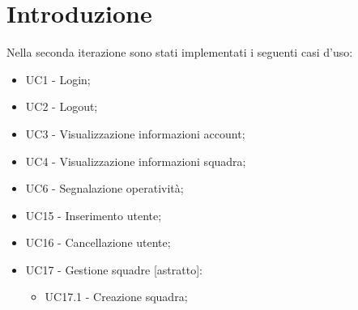 \section{Introduzione}
Nella seconda iterazione sono stati implementati i seguenti casi d'uso:
\begin{itemize}
	\item UC1 - Login;
	\item UC2 - Logout;
	\item UC3 - Visualizzazione informazioni account;
	\item UC4 - Visualizzazione informazioni squadra;
	\item UC6 - Segnalazione operatività;
	\item UC15 - Inserimento utente;
	\item UC16 - Cancellazione utente;
	\item UC17 - Gestione squadre [astratto]:
	\begin{itemize}
		\item UC17.1 - Creazione squadra;
	\end{itemize}
\end{itemize}

